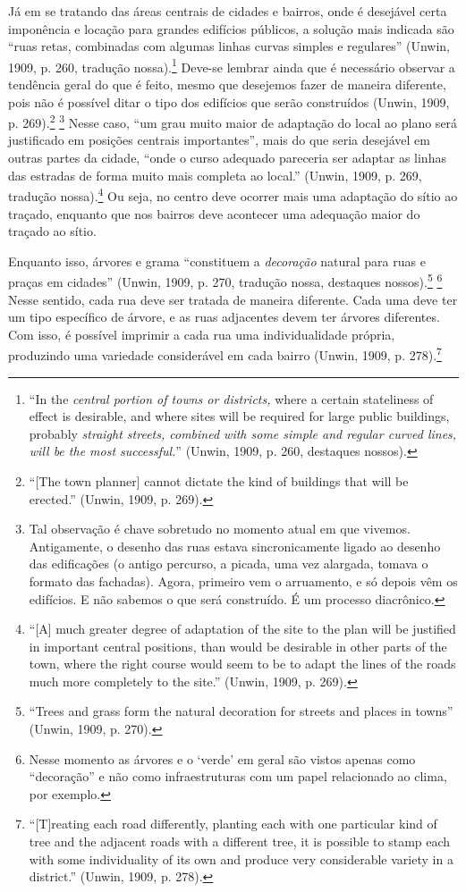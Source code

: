 \documentclass[12pt, a4paper]{book} %
\begin{document}
        Já em se tratando das áreas centrais de cidades e bairros, onde é desejável certa imponência e locação para grandes edifícios públicos, a solução mais indicada são ``ruas retas, combinadas com algumas linhas curvas simples e regulares'' (Unwin, 1909, p. 260, tradução nossa).\footnote[90]{``In the \textit{central portion of towns or districts,} where a certain stateliness of effect is desirable, and where sites will be required for large public buildings, probably \textit{straight streets, combined with some simple and regular curved lines, will be the most successful.}'' (Unwin, 1909, p. 260, destaques nossos).} Deve-se lembrar ainda que é necessário observar a tendência geral do que é feito, mesmo que desejemos fazer de maneira diferente, pois não é possível ditar o tipo dos edifícios que serão construídos (Unwin, 1909, p. 269).\footnote[91]{``[The town planner] cannot dictate the kind of buildings that will be erected.'' (Unwin, 1909, p. 269).} \footnote[92]{Tal observação é chave sobretudo no momento atual em que vivemos. Antigamente, o desenho das ruas estava sincronicamente ligado ao desenho das edificações (o antigo percurso, a picada, uma vez alargada, tomava o formato das fachadas). Agora, primeiro vem o arruamento, e só depois vêm os edifícios. E não sabemos o que será construído. É um processo diacrônico.} Nesse caso, ``um grau muito maior de adaptação do local ao plano será justificado em posições centrais importantes'', mais do que seria desejável em outras partes da cidade, ``onde o curso adequado pareceria ser adaptar as linhas das estradas de forma muito mais completa ao local.'' (Unwin, 1909, p. 269, tradução nossa).\footnote[93]{``[A] much greater degree of adaptation of the site to the plan will be justified in important central positions, than would be desirable in other parts of the town, where the right course would seem to be to adapt the lines of the roads much more completely to the site.'' (Unwin, 1909, p. 269).} Ou seja, no centro deve ocorrer mais uma adaptação do sítio ao traçado, enquanto que nos bairros deve acontecer uma adequação maior do traçado ao sítio.

        Enquanto isso, árvores e grama ``constituem a \textit{decoração} natural para ruas e praças em cidades'' (Unwin, 1909, p. 270, tradução nossa, destaques nossos).\footnote[94]{``Trees and grass form the natural decoration for streets and places in towns'' (Unwin, 1909, p. 270).} \footnote[95]{Nesse momento as árvores e o `verde' em geral são vistos apenas como ``decoração'' e não como infraestruturas com um papel relacionado ao clima, por exemplo.} Nesse sentido, cada rua deve ser tratada de maneira diferente. Cada uma deve ter um tipo específico de árvore, e as ruas adjacentes devem ter árvores diferentes. Com isso, é possível imprimir a cada rua uma individualidade própria, produzindo uma variedade considerável em cada bairro (Unwin, 1909, p. 278).\footnote[95]{``[T]reating each road differently, planting each with one particular kind of tree and the adjacent roads with a different tree, it is possible to stamp each with some individuality of its own and produce very considerable variety in a district.'' (Unwin, 1909, p. 278).}
\end{document}
